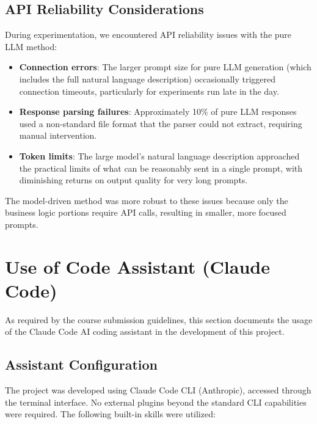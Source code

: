 \documentclass[11pt,a4paper]{article}
\begin{document}
{{\subsection{API Reliability Considerations}

During experimentation, we encountered API reliability issues with the pure LLM method:

\begin{itemize}
    \item \textbf{Connection errors}: The larger prompt size for pure LLM generation (which includes the full natural language description) occasionally triggered connection timeouts, particularly for experiments run late in the day.
    \item \textbf{Response parsing failures}: Approximately 10\% of pure LLM responses used a non-standard file format that the parser could not extract, requiring manual intervention.
    \item \textbf{Token limits}: The large model's natural language description approached the practical limits of what can be reasonably sent in a single prompt, with diminishing returns on output quality for very long prompts.
\end{itemize}

The model-driven method was more robust to these issues because only the business logic portions require API calls, resulting in smaller, more focused prompts.

\newpage
\section{Use of Code Assistant (Claude Code)}
\label{sec:code-assistant}

As required by the course submission guidelines, this section documents the usage of the Claude Code AI coding assistant in the development of this project.

\subsection{Assistant Configuration}

The project was developed using Claude Code CLI (Anthropic), accessed through the terminal interface. No external plugins beyond the standard CLI capabilities were required. The following built-in skills were utilized:

}}
\end{document}

